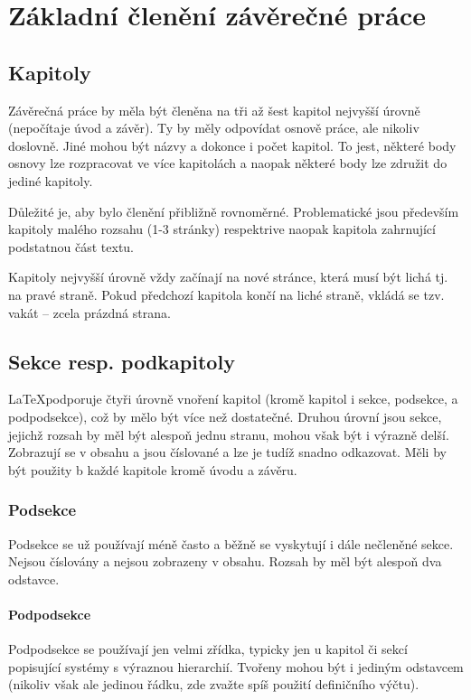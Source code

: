 \documentclass[male,czech,api_bc]{kitheses}
\begin{document}
\chapter{Základní členění závěrečné práce}

\section{Kapitoly}

Závěrečná práce by měla být členěna na tři až šest kapitol nejvyšší úrovně (nepočítaje úvod a závěr). Ty by měly odpovídat osnově práce, ale nikoliv doslovně. Jiné mohou být názvy a dokonce i počet kapitol. To jest, některé body osnovy lze rozpracovat ve více kapitolách a naopak některé body lze združit do jediné kapitoly.

Důležité je, aby bylo členění přibližně rovnoměrné. Problematické jsou především kapitoly malého rozsahu (1-3 stránky) respektrive naopak kapitola zahrnující podstatnou část textu.

Kapitoly nejvyšší úrovně vždy začínají na nové stránce, která musí být lichá tj. na pravé straně. Pokud předchozí kapitola končí na liché straně, vkládá se tzv. vakát -- zcela prázdná strana. 

\section{Sekce resp. podkapitoly}

\LaTeX podporuje čtyři úrovně vnoření kapitol (kromě kapitol i sekce, podsekce, a podpodsekce), což by mělo být více než dostatečné. Druhou úrovní jsou sekce, jejichž rozsah by měl být alespoň jednu stranu, mohou však být
i výrazně delší. Zobrazují se v obsahu a jsou číslované a lze je tudíž snadno odkazovat. Měli by být použity b každé kapitole kromě úvodu a závěru.

\subsection{Podsekce}

Podsekce se už používají méně často a běžně se vyskytují i dále nečleněné sekce. Nejsou číslovány a nejsou zobrazeny v obsahu. Rozsah by měl být alespoň dva odstavce.

\subsubsection{Podpodsekce}

Podpodsekce se používají jen velmi zřídka, typicky jen u kapitol či sekcí popisující systémy s výraznou hierarchií. Tvořeny mohou být i jediným odstavcem (nikoliv však ale jedinou řádku, zde zvažte spíš použití definičního výčtu).
\end{document}

